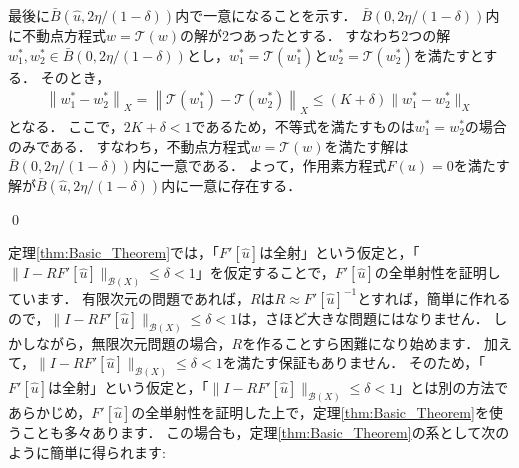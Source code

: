 \begin{Proof}
	最後に$\bar{B}(\hat{u}, 2 \eta/(1-\delta))$内で一意になることを示す．
	$\bar{B}(0, 2 \eta/(1-\delta))$内に不動点方程式$w = {\mathcal T}(w)$の解が2つあったとする．
	すなわち2つの解$w_1^*, w_2^* \in \bar{B}(0, 2 \eta/(1-\delta))$とし，$w_1^*= {\mathcal T}(w_1^*) $と$w_2^*= {\mathcal T}(w_2^*) $を満たすとする．
	そのとき，
	\begin{align*}
		\left\| w_1^* - w_2^* \right\|_{X} = \left\| {\mathcal T}(w_1^*) - {\mathcal T}(w_2^*) \right\|_{X} \le \left( K + \delta \right) \| w_1^* - w_2^* \|_{X}
	\end{align*}
	となる．
	ここで，$2K + \delta < 1$であるため，不等式を満たすものは$w_1^* = w_2^*$の場合のみである．
	すなわち，不動点方程式$w = {\mathcal T}(w)$を満たす解は$\bar{B}(0, 2 \eta/(1-\delta))$内に一意である．
	よって，作用素方程式$F(u) = 0$を満たす解が$\bar{B}(\hat{u}, 2 \eta/(1-\delta))$内に一意に存在する．
	
\qed
\end{Proof}

定理\ref{thm:Basic_Theorem}では，「$F'[\hat{u}]$は全射」という仮定と，「$\| I -  R F'[\hat{u}] \|_{{\mathcal B}(X)} \le \delta < 1$」を仮定することで，$F'[\hat{u}]$の全単射性を証明しています．
有限次元の問題であれば，$R$は$R \approx F'[\hat{u}]^{-1}$とすれば，簡単に作れるので，$\| I -  R F'[\hat{u}] \|_{{\mathcal B}(X)} \le \delta < 1$は，さほど大きな問題にはなりません．
しかしながら，無限次元問題の場合，$R$を作ることすら困難になり始めます．
加えて，$\| I -  R F'[\hat{u}] \|_{{\mathcal B}(X)} \le \delta < 1$を満たす保証もありません．
そのため，「$F'[\hat{u}]$は全射」という仮定と，「$\| I -  R F'[\hat{u}] \|_{{\mathcal B}(X)} \le \delta < 1$」とは別の方法であらかじめ，$F'[\hat{u}]$の全単射性を証明した上で，定理\ref{thm:Basic_Theorem}を使うことも多々あります．
この場合も，定理\ref{thm:Basic_Theorem}の系として次のように簡単に得られます:


